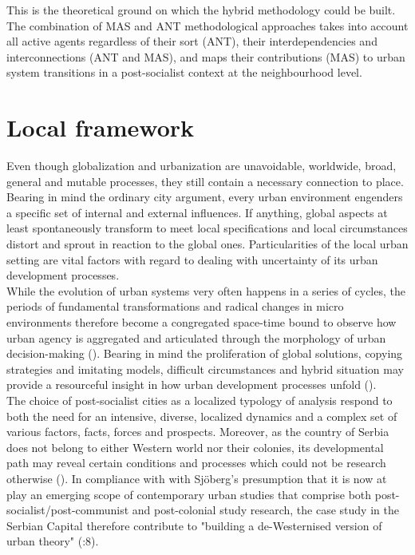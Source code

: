 \documentclass[11pt]{report}
\begin{document}
This is the theoretical ground on which the hybrid methodology could be built. The combination of MAS and ANT methodological approaches takes into account all active agents regardless of their sort (ANT), their interdependencies and interconnections (ANT and MAS), and maps their contributions (MAS) to urban system transitions  in a post-socialist context at the neighbourhood level.

\section{Local framework}

Even though globalization and urbanization are unavoidable,  worldwide,  broad,  general  and  mutable  processes, they still  contain  a  necessary connection to place.
Bearing in mind the ordinary city argument, every urban environment engenders a specific set of internal and external influences.
If anything, global aspects at least spontaneously transform to meet local specifications and local circumstances distort and sprout in reaction to the global ones. Particularities of the local urban setting are vital factors with regard to dealing with uncertainty of its urban development processes.
\\

While the evolution of urban systems very often happens in a series of cycles, the periods of fundamental transformations and radical changes in micro environments therefore become a congregated space-time bound to observe how urban agency is aggregated and articulated through the morphology of urban decision-making (\cite{Watson 1998 from waves of planning 2006}).
Bearing in mind the proliferation of global solutions, copying strategies and imitating models, difficult circumstances and hybrid situation may provide a resourceful insight in how urban development processes unfold (\cite{Harris 2001 from waves of planning 2006}).
\\

The choice of post-socialist cities as a localized typology of analysis respond to both the need for an intensive, diverse, localized dynamics and a complex set of various factors, facts, forces and prospects.
Moreover, as the country of Serbia does not belong to either Western world nor their colonies, its developmental path may reveal certain conditions and processes which could not be research otherwise (\citealt{Ward 2000 Diffusion of planning}).
In compliance with with Sjöberg's presumption that it is now at play an emerging scope of contemporary urban studies that comprise both post-socialist/post-communist and post-colonial study research, the case study in the Serbian Capital therefore contribute to "building a de-Westernised version of urban theory" (\cite{Sjöberg 2014}:8).
\\
\end{document}

